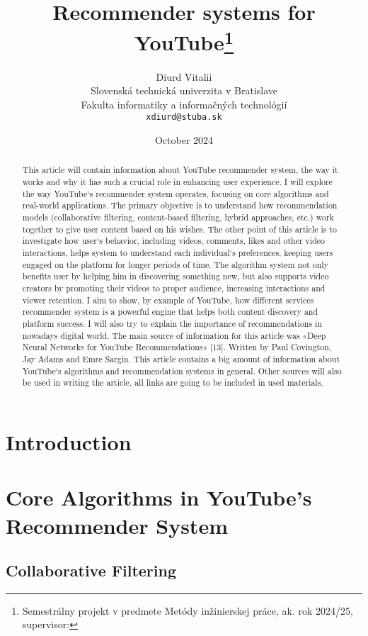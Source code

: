\documentclass[12pt,english,a4paper]{article}
\title{Recommender systems for YouTube\thanks{Semestrálny projekt v predmete Metódy inžinierskej práce, ak. rok 2024/25, supervisor: }}
\author{Diurd Vitalii\\[2pt]
	{\small Slovenská technická univerzita v Bratislave}\\
	{\small Fakulta informatiky a informačných technológií}\\
	{\small \texttt{xdiurd@stuba.sk}}
	}
\date{\small October 2024} %
\begin{document}
\maketitle

\begin{abstract}
This article will contain information about YouTube recommender system, the way it works and why it has such a crucial role in enhancing user experience. I will explore the way YouTube`s recommender system operates, focusing on core algorithms and real-world applications. The primary objective is to understand how recommendation models (collaborative filtering, content-based filtering, hybrid approaches, etc.) work together to give user content based on his wishes. The other point of this article is to investigate how user`s behavior, including videos, comments, likes and other video interactions, helps system to understand each individual`s preferences, keeping users engaged on the platform for longer periods of time. The algorithm system not only benefits user by helping him in discovering something new, but also supports video creators by promoting their videos to proper audience, increasing interactions and viewer retention. I aim to show, by example of YouTube,   how different services recommender system is a powerful engine that helps both content discovery and platform success. I will also try to explain the importance of recommendations in nowadays digital world. The main source of information for this article was «Deep Neural Networks for YouTube Recommendations» [13].  Written by Paul Covington, Jay Adams and Emre Sargin. This article contains a big amount of information about YouTube`s algorithms and recommendation systems in general. Other sources will also be used in writing the article, all links are going to be included in used materials.
\end{abstract}

\section{Introduction} \label{intro}

\section{Core Algorithms in YouTube’s Recommender System} \label{core}
\subsection{Collaborative Filtering} \label{core:collaborative}
\end{document}
